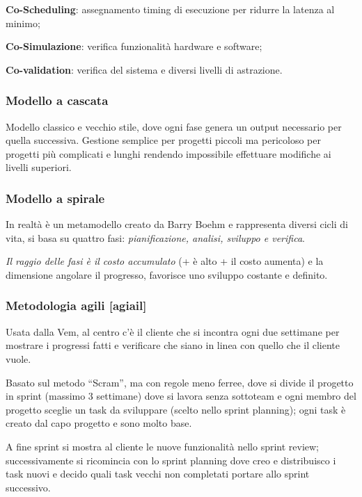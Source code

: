 \textbf{Co-Scheduling}: assegnamento timing di esecuzione per ridurre la
latenza al minimo;

\textbf{Co-Simulazione}: verifica funzionalità hardware e software;

\textbf{Co-validation}: verifica del sistema e diversi livelli di
astrazione.

\subsubsection{Modello a cascata}\label{modello-a-cascata}

Modello classico e vecchio stile, dove ogni fase genera un output
necessario per quella successiva. Gestione semplice per progetti piccoli
ma pericoloso per progetti più complicati e lunghi rendendo impossibile
effettuare modifiche ai livelli superiori.

\subsubsection{Modello a spirale}\label{modello-a-spirale}

In realtà è un metamodello creato da Barry Boehm e rappresenta diversi
cicli di vita, si basa su quattro fasi: \emph{pianificazione, analisi,
sviluppo e verifica}.

\emph{Il raggio delle fasi è il costo accumulato} (+ è alto + il costo
aumenta) e la dimensione angolare il progresso, favorisce uno sviluppo
costante e definito.

\subsubsection{Metodologia agili
{[}agiail{]}}\label{metodologia-agili-agiail}

Usata dalla Vem, al centro c'è il cliente che si incontra ogni due
settimane per mostrare i progressi fatti e verificare che siano in linea
con quello che il cliente vuole.

Basato sul metodo ``Scram'', ma con regole meno ferree, dove si divide
il progetto in sprint (massimo 3 settimane) dove si lavora senza
sottoteam e ogni membro del progetto sceglie un task da sviluppare
(scelto nello sprint planning); ogni task è creato dal capo progetto e
sono molto base.

A fine sprint si mostra al cliente le nuove funzionalità nello sprint
review; successivamente si ricomincia con lo sprint planning dove creo e
distribuisco i task nuovi e decido quali task vecchi non completati
portare allo sprint successivo.


